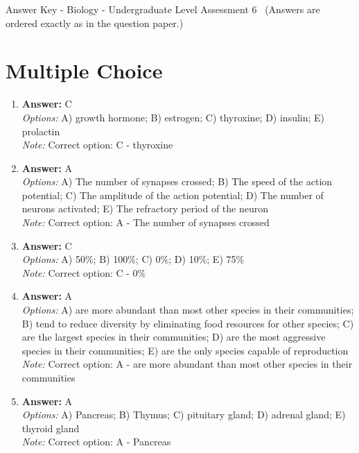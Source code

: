 \documentclass[12pt]{article}
\begin{document}
\begin{center}
Answer Key - Biology - Undergraduate Level Assessment 6 \
\small (Answers are ordered exactly as in the question paper.)
\end{center}

\section*{Multiple Choice}
\begin{enumerate}[label=\arabic*.]
\item \textbf{Answer:} C
\\ \textit{Options:} A) growth hormone; B) estrogen; C) thyroxine; D) insulin; E) prolactin
\\ \textit{Note:} Correct option: C - thyroxine
\item \textbf{Answer:} A
\\ \textit{Options:} A) The number of synapses crossed; B) The speed of the action potential; C) The amplitude of the action potential; D) The number of neurons activated; E) The refractory period of the neuron
\\ \textit{Note:} Correct option: A - The number of synapses crossed
\item \textbf{Answer:} C
\\ \textit{Options:} A) 50\%; B) 100\%; C) 0\%; D) 10\%; E) 75\%
\\ \textit{Note:} Correct option: C - 0\%
\item \textbf{Answer:} A
\\ \textit{Options:} A) are more abundant than most other species in their communities; B) tend to reduce diversity by eliminating food resources for other species; C) are the largest species in their communities; D) are the most aggressive species in their communities; E) are the only species capable of reproduction
\\ \textit{Note:} Correct option: A - are more abundant than most other species in their communities
\item \textbf{Answer:} A
\\ \textit{Options:} A) Pancreas; B) Thymus; C) pituitary gland; D) adrenal gland; E) thyroid gland
\\ \textit{Note:} Correct option: A - Pancreas
\end{enumerate}
\end{document}
